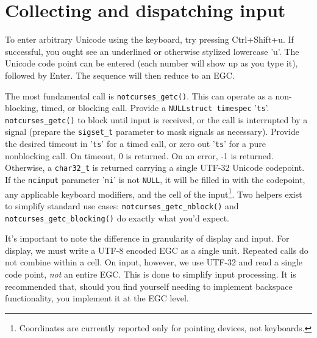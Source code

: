 \section{Collecting and dispatching input}
\label{sec:input}

To enter arbitrary Unicode using the keyboard, try pressing Ctrl+Shift+u. If
successful, you ought see an underlined or otherwise stylized lowercase 'u'.
The Unicode code point can be entered (each number will show up as you type it),
followed by Enter. The sequence will then reduce to an EGC.

The most fundamental call is \texttt{notcurses\_getc()}. This can operate as a
non-blocking, timed, or blocking call. Provide a \texttt{NULL}\texttt{struct timespec} '\texttt{ts}'.
\texttt{notcurses\_getc()} to block until input is received, or the call is
interrupted by a signal (prepare the \texttt{sigset\_t} parameter to mask signals
as necessary). Provide the desired timeout in '\texttt{ts}' for a timed call,
or zero out '\texttt{ts}' for a pure nonblocking call. On timeout, 0 is returned.
On an error, -1 is returned. Otherwise, a \texttt{char32\_t} is returned carrying
a single UTF-32 Unicode codepoint. If the \texttt{ncinput} parameter '\texttt{ni}'
is not \texttt{NULL}, it will be filled in with the codepoint, any applicable
keyboard modifiers, and the cell of the input\footnote{Coordinates are currently
reported only for pointing devices, not keyboards.}. Two helpers exist to simplify
standard use cases: \texttt{notcurses\_getc\_nblock()} and \texttt{notcurses\_getc\_blocking()}
do exactly what you'd expect.

It's important to note the difference in granularity of display and input. For
display, we must write a UTF-8 encoded EGC as a single unit. Repeated calls do
not combine within a cell. On input, however, we use UTF-32 and read a single
code point, \textit{not} an entire EGC. This is done to simplify input
processing. It is recommended that, should you find yourself needing to
implement backspace functionality, you implement it at the EGC level.

